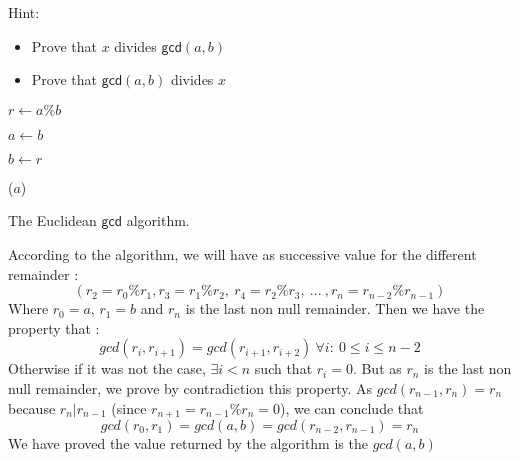 Hint:
\begin{itemize}
\item Prove that $x$ divides  $ \mathsf{gcd} (a,b)$
\item Prove that $ \mathsf{gcd} (a,b)$ divides $x$
\end{itemize}

\begin{algorithm}
	
	{
		$r \leftarrow a\%b$\;
		
		$a \leftarrow b$\;	
		
		$b \leftarrow r$\;	
	}
	\Return($a$)
	
\caption{The Euclidean $\mathsf{gcd}$ algorithm.}\label{algo:gcd}
\end{algorithm}
\begin{solution}
According to the algorithm, we will have as successive value for the different remainder : 
$$ (r_2 = r_0 \% r_1, r_3 = r_1 \% r_2, \ r_4 = r_2 \% r_3, \ ... \ , r_n =  r_{n-2} \% r_{n-1})$$
Where $r_0 = a$, $r_1 = b$ and $r_n$ is the last non null remainder. Then we have the property that :
$$ gcd(r_{i}, r_{i+1}) = gcd(r_{i+1}, r_{i+2}) \ \forall i : \ 0 \leq i \leq n - 2 $$
Otherwise if it was not the case, $\exists i < n $ such that $r_i = 0$. But as $r_n$ is the last non null remainder, we prove by contradiction this property.
\newline \newline As $gcd(r_{n-1}, r_n) = r_n $ because $r_n | r_{n-1}$ (since $r_{n+1} = r_{n-1} \% r_n = 0$), we can conclude that 
$$ gcd(r_0, r_1) = gcd(a, b) = gcd(r_{n-2}, r_{n-1}) = r_n$$
We have proved the value returned by the algorithm is the $gcd(a,b)$
\end{solution}

